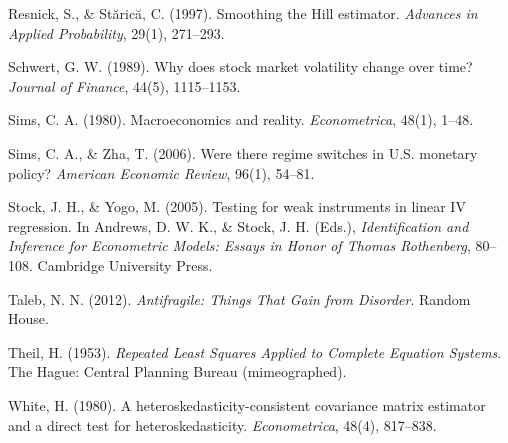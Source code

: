 \documentclass[
]{article}
\begin{document}
Resnick, S., \& Stărică, C. (1997). Smoothing the Hill estimator.
\emph{Advances in Applied Probability}, 29(1), 271--293.

Schwert, G. W. (1989). Why does stock market volatility change over
time? \emph{Journal of Finance}, 44(5), 1115--1153.

Sims, C. A. (1980). Macroeconomics and reality. \emph{Econometrica},
48(1), 1--48.

Sims, C. A., \& Zha, T. (2006). Were there regime switches in U.S.
monetary policy? \emph{American Economic Review}, 96(1), 54--81.

Stock, J. H., \& Yogo, M. (2005). Testing for weak instruments in linear
IV regression. In Andrews, D. W. K., \& Stock, J. H. (Eds.),
\emph{Identification and Inference for Econometric Models: Essays in
Honor of Thomas Rothenberg}, 80--108. Cambridge University Press.

Taleb, N. N. (2012). \emph{Antifragile: Things That Gain from Disorder}.
Random House.

Theil, H. (1953). \emph{Repeated Least Squares Applied to Complete
Equation Systems}. The Hague: Central Planning Bureau (mimeographed).

White, H. (1980). A heteroskedasticity-consistent covariance matrix
estimator and a direct test for heteroskedasticity. \emph{Econometrica},
48(4), 817--838.
\end{document}
